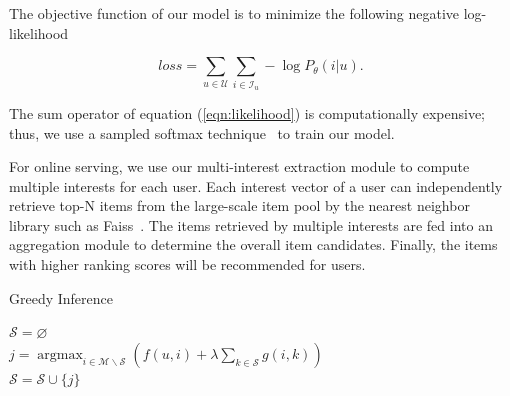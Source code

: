 The objective function of our model is to minimize the following negative log-likelihood

\begin{equation}
    \label{eqn:loss}
    loss = \sum_{u\in \mathcal{U}} \sum_{i\in \mathcal{I}_u} -\log P_\theta(i|u).
\end{equation}

The sum operator of equation (\ref{eqn:likelihood}) is computationally expensive; thus, we use a sampled softmax technique~\cite{jean2014using, covington2016deep} to train our model.

For online serving, we use our multi-interest extraction module to compute multiple interests for each user. Each interest vector of a user can independently retrieve top-N items from the large-scale item pool by the nearest neighbor library such as Faiss~\cite{JDH17}. The items retrieved by multiple interests are fed into an aggregation module to determine the overall item candidates. Finally, the items with higher ranking scores will be recommended for users.




\begin{algorithm}[t]
	\caption{Greedy Inference \label{algo:greedy_infer}}
	$\mathcal{S} = \varnothing$ \\
     {
        $j = \operatorname{argmax}_{i \in \mathcal{M} \backslash \mathcal{S}} \left( f(u, i) + \lambda \sum_{k \in \mathcal{S}} g(i,k) \right)$ \\
        $\mathcal{S} = \mathcal{S} \cup \{j\}$
    }
\end{algorithm}

